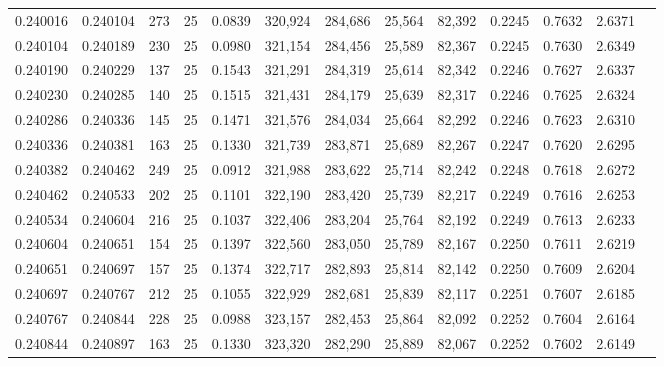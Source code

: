 \begin{tabular}{rrrrrrrrrrrrr}
0.240016 & 0.240104 &   273 &  25 &                                     0.0839 & 320,924 & 284,686 &  25,564 &  82,392 & 0.2245 & 0.7632 & 2.6371 \\
0.240104 & 0.240189 &   230 &  25 &                                     0.0980 & 321,154 & 284,456 &  25,589 &  82,367 & 0.2245 & 0.7630 & 2.6349 \\
0.240190 & 0.240229 &   137 &  25 &                                     0.1543 & 321,291 & 284,319 &  25,614 &  82,342 & 0.2246 & 0.7627 & 2.6337 \\
0.240230 & 0.240285 &   140 &  25 &                                     0.1515 & 321,431 & 284,179 &  25,639 &  82,317 & 0.2246 & 0.7625 & 2.6324 \\
0.240286 & 0.240336 &   145 &  25 &                                     0.1471 & 321,576 & 284,034 &  25,664 &  82,292 & 0.2246 & 0.7623 & 2.6310 \\
0.240336 & 0.240381 &   163 &  25 &                                     0.1330 & 321,739 & 283,871 &  25,689 &  82,267 & 0.2247 & 0.7620 & 2.6295 \\
0.240382 & 0.240462 &   249 &  25 &                                     0.0912 & 321,988 & 283,622 &  25,714 &  82,242 & 0.2248 & 0.7618 & 2.6272 \\
0.240462 & 0.240533 &   202 &  25 &                                     0.1101 & 322,190 & 283,420 &  25,739 &  82,217 & 0.2249 & 0.7616 & 2.6253 \\
0.240534 & 0.240604 &   216 &  25 &                                     0.1037 & 322,406 & 283,204 &  25,764 &  82,192 & 0.2249 & 0.7613 & 2.6233 \\
0.240604 & 0.240651 &   154 &  25 &                                     0.1397 & 322,560 & 283,050 &  25,789 &  82,167 & 0.2250 & 0.7611 & 2.6219 \\
0.240651 & 0.240697 &   157 &  25 &                                     0.1374 & 322,717 & 282,893 &  25,814 &  82,142 & 0.2250 & 0.7609 & 2.6204 \\
0.240697 & 0.240767 &   212 &  25 &                                     0.1055 & 322,929 & 282,681 &  25,839 &  82,117 & 0.2251 & 0.7607 & 2.6185 \\
0.240767 & 0.240844 &   228 &  25 &                                     0.0988 & 323,157 & 282,453 &  25,864 &  82,092 & 0.2252 & 0.7604 & 2.6164 \\
0.240844 & 0.240897 &   163 &  25 &                                     0.1330 & 323,320 & 282,290 &  25,889 &  82,067 & 0.2252 & 0.7602 & 2.6149 \\

\end{tabular}
